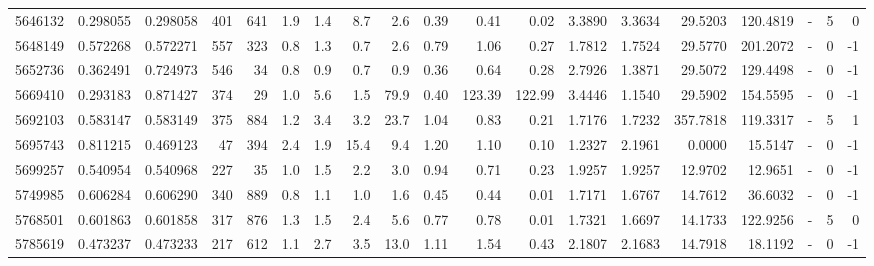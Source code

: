 \begin{tabular}{rrrrrrrrrrrrrrrrlrr}
   5646132 & 0.298055 &   0.298058 &  401 &  641 &      1.9 &      1.4 &     8.7 &      2.6 &       0.39 &        0.41 &        0.02 &  3.3890 &  3.3634 &   29.5203 &  120.4819 &             - &        5 &          0 \\
   5648149 & 0.572268 &   0.572271 &  557 &  323 &      0.8 &      1.3 &     0.7 &      2.6 &       0.79 &        1.06 &        0.27 &  1.7812 &  1.7524 &   29.5770 &  201.2072 &             - &        0 &         -1 \\
   5652736 & 0.362491 &   0.724973 &  546 &   34 &      0.8 &      0.9 &     0.7 &      0.9 &       0.36 &        0.64 &        0.28 &  2.7926 &  1.3871 &   29.5072 &  129.4498 &             - &        0 &         -1 \\
   5669410 & 0.293183 &   0.871427 &  374 &   29 &      1.0 &      5.6 &     1.5 &     79.9 &       0.40 &      123.39 &      122.99 &  3.4446 &  1.1540 &   29.5902 &  154.5595 &             - &        0 &         -1 \\
   5692103 & 0.583147 &   0.583149 &  375 &  884 &      1.2 &      3.4 &     3.2 &     23.7 &       1.04 &        0.83 &        0.21 &  1.7176 &  1.7232 &  357.7818 &  119.3317 &             - &        5 &          1 \\
   5695743 & 0.811215 &   0.469123 &   47 &  394 &      2.4 &      1.9 &    15.4 &      9.4 &       1.20 &        1.10 &        0.10 &  1.2327 &  2.1961 &    0.0000 &   15.5147 &             - &        0 &         -1 \\
   5699257 & 0.540954 &   0.540968 &  227 &   35 &      1.0 &      1.5 &     2.2 &      3.0 &       0.94 &        0.71 &        0.23 &  1.9257 &  1.9257 &   12.9702 &   12.9651 &             - &        0 &         -1 \\
   5749985 & 0.606284 &   0.606290 &  340 &  889 &      0.8 &      1.1 &     1.0 &      1.6 &       0.45 &        0.44 &        0.01 &  1.7171 &  1.6767 &   14.7612 &   36.6032 &             - &        0 &         -1 \\
   5768501 & 0.601863 &   0.601858 &  317 &  876 &      1.3 &      1.5 &     2.4 &      5.6 &       0.77 &        0.78 &        0.01 &  1.7321 &  1.6697 &   14.1733 &  122.9256 &             - &        5 &          0 \\
   5785619 & 0.473237 &   0.473233 &  217 &  612 &      1.1 &      2.7 &     3.5 &     13.0 &       1.11 &        1.54 &        0.43 &  2.1807 &  2.1683 &   14.7918 &   18.1192 &             - &        0 &         -1 \\

\end{tabular}
